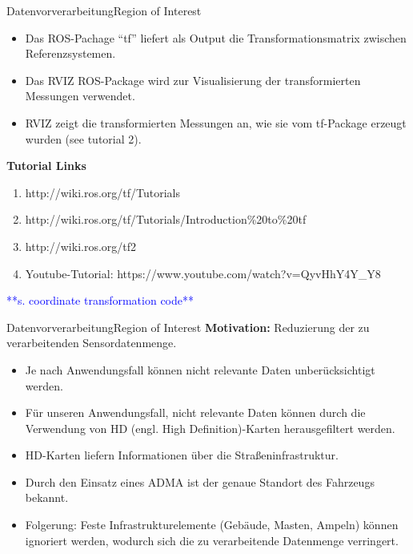 \documentclass[169, handout	]{THIbeamer} %
\begin{document}
\begin{frame}{Datenvorverarbeitung}{Region of Interest}
	\footnotesize
	\begin{itemize}
		\item Das ROS-Pachage \enquote{tf} liefert als Output die Transformationsmatrix zwischen Referenzsystemen.
		\item Das RVIZ ROS-Package wird zur Visualisierung der transformierten Messungen verwendet.
		\item RVIZ zeigt die transformierten Messungen an, wie sie vom tf-Package erzeugt wurden (see tutorial 2).
	\end{itemize}
	\textbf{Tutorial Links}
	\begin{enumerate}
		\item http://wiki.ros.org/tf/Tutorials
		\item http://wiki.ros.org/tf/Tutorials/Introduction\%20to\%20tf
		\item http://wiki.ros.org/tf2
		\item Youtube-Tutorial: https://www.youtube.com/watch?v=QyvHhY4Y\_Y8
	\end{enumerate}

\textcolor{blue}{**s. coordinate transformation code**}

\end{frame}
	\begin{frame}{Datenvorverarbeitung}{Region of Interest}
		\textbf{Motivation:} Reduzierung der zu verarbeitenden Sensordatenmenge.
		\begin{itemize}
			\item Je nach Anwendungsfall können nicht relevante Daten unberücksichtigt werden.
			\item Für unseren Anwendungsfall, nicht relevante Daten können durch die Verwendung von HD (engl. High Definition)-Karten herausgefiltert werden.
			\item HD-Karten liefern Informationen über die Straßeninfrastruktur.
			\item Durch den Einsatz eines ADMA ist der genaue Standort des Fahrzeugs bekannt.
			\item Folgerung: Feste Infrastrukturelemente (Gebäude, Masten, Ampeln) können ignoriert werden, wodurch sich die zu verarbeitende Datenmenge verringert.
		\end{itemize}
	\end{frame}
\end{document}

